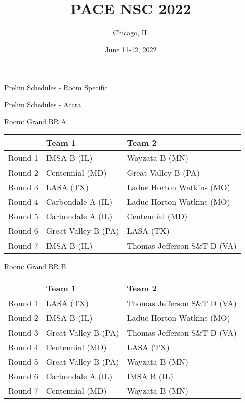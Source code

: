 \documentclass{article}%
\title{PACE NSC 2022}%
\author{Chicago, IL}%
\date{June 11{-}12, 2022}%
\begin{document}
%
\normalsize%
%
\maketitle%
\vspace*{48pt}%
\begin{center}%
\begin{Huge}%
Prelim Schedules {-} Room Specific%
\end{Huge}%
\end{center}%
\newpage%
\begin{center}%
\begin{Huge}%
Prelim Schedules {-} Accra%
\end{Huge}%
\end{center}%
\begin{flushleft}%
\begin{Large}%
Room: Grand BR A%
\end{Large}%
\end{flushleft}%
\begin{tabularx}{\textwidth}{|c|Y|Y|}%
\hline%
&Team 1&Team 2\\%
\hline%
Round 1&IMSA B (IL)&Wayzata B (MN)\\%
Round 2&Centennial (MD)&Great Valley B (PA)\\%
Round 3&LASA (TX)&Ladue Horton Watkins (MO)\\%
Round 4&Carbondale A (IL)&Ladue Horton Watkins (MO)\\%
Round 5&Carbondale A (IL)&Centennial (MD)\\%
Round 6&Great Valley B (PA)&LASA (TX)\\%
Round 7&IMSA B (IL)&Thomas Jefferson S\&T D (VA)\\%
\hline%
\end{tabularx}%
\vspace*{8pt}%
\linebreak%
\begin{flushleft}%
\begin{Large}%
Room: Grand BR B%
\end{Large}%
\end{flushleft}%
\begin{tabularx}{\textwidth}{|c|Y|Y|}%
\hline%
&Team 1&Team 2\\%
\hline%
Round 1&LASA (TX)&Thomas Jefferson S\&T D (VA)\\%
Round 2&IMSA B (IL)&Ladue Horton Watkins (MO)\\%
Round 3&Great Valley B (PA)&Thomas Jefferson S\&T D (VA)\\%
Round 4&Centennial (MD)&LASA (TX)\\%
Round 5&Great Valley B (PA)&Wayzata B (MN)\\%
Round 6&Carbondale A (IL)&IMSA B (IL)\\%
Round 7&Centennial (MD)&Wayzata B (MN)\\%
\hline%
\end{tabularx}%
\end{document}
